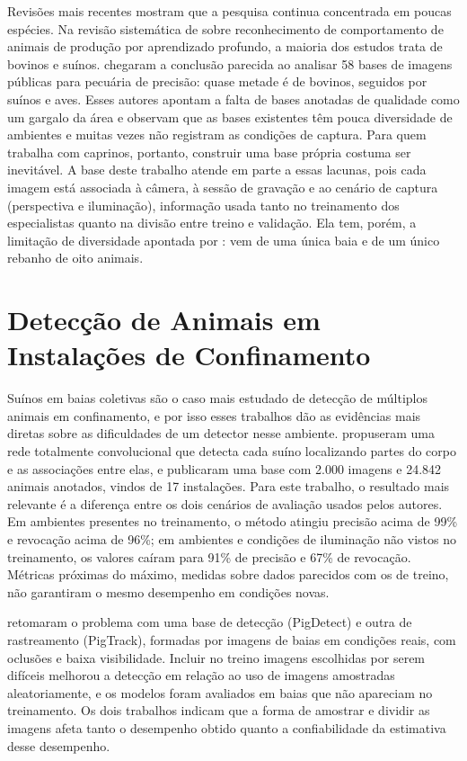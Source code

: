 Revisões mais recentes mostram que a pesquisa continua concentrada em poucas espécies. Na revisão sistemática de  sobre reconhecimento de comportamento de animais de produção por aprendizado profundo, a maioria dos estudos trata de bovinos e suínos.  chegaram a conclusão parecida ao analisar 58 bases de imagens públicas para pecuária de precisão: quase metade é de bovinos, seguidos por suínos e aves. Esses autores apontam a falta de bases anotadas de qualidade como um gargalo da área e observam que as bases existentes têm pouca diversidade de ambientes e muitas vezes não registram as condições de captura. Para quem trabalha com caprinos, portanto, construir uma base própria costuma ser inevitável. A base deste trabalho atende em parte a essas lacunas, pois cada imagem está associada à câmera, à sessão de gravação e ao cenário de captura (perspectiva e iluminação), informação usada tanto no treinamento dos especialistas quanto na divisão entre treino e validação. Ela tem, porém, a limitação de diversidade apontada por : vem de uma única baia e de um único rebanho de oito animais.

\section{Detecção de Animais em Instalações de Confinamento}
\label{sec:deteccao-confinamento}

Suínos em baias coletivas são o caso mais estudado de detecção de múltiplos animais em confinamento, e por isso esses trabalhos dão as evidências mais diretas sobre as dificuldades de um detector nesse ambiente.  propuseram uma rede totalmente convolucional que detecta cada suíno localizando partes do corpo e as associações entre elas, e publicaram uma base com 2.000 imagens e 24.842 animais anotados, vindos de 17 instalações. Para este trabalho, o resultado mais relevante é a diferença entre os dois cenários de avaliação usados pelos autores. Em ambientes presentes no treinamento, o método atingiu precisão acima de 99\% e revocação acima de 96\%; em ambientes e condições de iluminação não vistos no treinamento, os valores caíram para 91\% de precisão e 67\% de revocação. Métricas próximas do máximo, medidas sobre dados parecidos com os de treino, não garantiram o mesmo desempenho em condições novas.

 retomaram o problema com uma base de detecção (PigDetect) e outra de rastreamento (PigTrack), formadas por imagens de baias em condições reais, com oclusões e baixa visibilidade. Incluir no treino imagens escolhidas por serem difíceis melhorou a detecção em relação ao uso de imagens amostradas aleatoriamente, e os modelos foram avaliados em baias que não apareciam no treinamento. Os dois trabalhos indicam que a forma de amostrar e dividir as imagens afeta tanto o desempenho obtido quanto a confiabilidade da estimativa desse desempenho.

